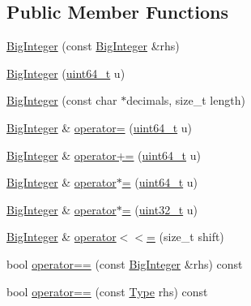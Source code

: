 \subsection*{Public Member Functions}
\begin{DoxyCompactItemize}
\item 
\hyperlink{classinternal_1_1BigInteger_abec623168bc9494dec2f50643b897f72}{Big\+Integer} (const \hyperlink{classinternal_1_1BigInteger}{Big\+Integer} \&rhs)
\item 
\hyperlink{classinternal_1_1BigInteger_ad02b0ef9da203efddd4af07e923732c0}{Big\+Integer} (\hyperlink{stdint_8h_aec6fcb673ff035718c238c8c9d544c47}{uint64\+\_\+t} u)
\item 
\hyperlink{classinternal_1_1BigInteger_a656bd1bd4af3920beb90ba4af87b6181}{Big\+Integer} (const char $\ast$decimals, size\+\_\+t length)
\item 
\hyperlink{classinternal_1_1BigInteger}{Big\+Integer} \& \hyperlink{classinternal_1_1BigInteger_a4002e0b1cf5ee68ab94ab65b35167a38}{operator=} (\hyperlink{stdint_8h_aec6fcb673ff035718c238c8c9d544c47}{uint64\+\_\+t} u)
\item 
\hyperlink{classinternal_1_1BigInteger}{Big\+Integer} \& \hyperlink{classinternal_1_1BigInteger_a09af1d6658d51ad4372649ce1c9c1a62}{operator+=} (\hyperlink{stdint_8h_aec6fcb673ff035718c238c8c9d544c47}{uint64\+\_\+t} u)
\item 
\hyperlink{classinternal_1_1BigInteger}{Big\+Integer} \& \hyperlink{classinternal_1_1BigInteger_a79a52c6135c9783f2e53432dce2cde89}{operator$\ast$=} (\hyperlink{stdint_8h_aec6fcb673ff035718c238c8c9d544c47}{uint64\+\_\+t} u)
\item 
\hyperlink{classinternal_1_1BigInteger}{Big\+Integer} \& \hyperlink{classinternal_1_1BigInteger_a83e8e464b7bc31c8b2c943f8563b2226}{operator$\ast$=} (\hyperlink{stdint_8h_a435d1572bf3f880d55459d9805097f62}{uint32\+\_\+t} u)
\item 
\hyperlink{classinternal_1_1BigInteger}{Big\+Integer} \& \hyperlink{classinternal_1_1BigInteger_a48b12ef4676f19290dfd5816a4ef4a88}{operator$<$$<$=} (size\+\_\+t shift)
\item 
bool \hyperlink{classinternal_1_1BigInteger_a567ecda3009de20400a2af649fb87e60}{operator==} (const \hyperlink{classinternal_1_1BigInteger}{Big\+Integer} \&rhs) const 
\item 
bool \hyperlink{classinternal_1_1BigInteger_a329eddac1b724f82d56af2ee2c8abcc4}{operator==} (const \hyperlink{classinternal_1_1BigInteger_a1310812fca26ebae77594ba08678fc4c}{Type} rhs) const 
\item 

\end{DoxyCompactItemize}
